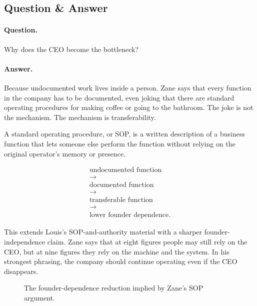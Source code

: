\documentclass[11pt,oneside]{book}
\begin{document}
\subsection{Question \& Answer}

\paragraph{Question.}
Why does the CEO become the bottleneck?

\paragraph{Answer.}
Because undocumented work lives inside a person. Zane says that every function in the company has to be documented, even joking that there are standard operating procedures for making coffee or going to the bathroom. The joke is not the mechanism. The mechanism is transferability.

A standard operating procedure, or SOP, is a written description of a business function that lets someone else perform the function without relying on the original operator's memory or presence.

\begin{equation}
\begin{gathered}
\text{undocumented function}\\
\longrightarrow\\
\text{documented function}\\
\longrightarrow\\
\text{transferable function}\\
\longrightarrow\\
\text{lower founder dependence}.
\end{gathered}
\end{equation}

This extends Louis's SOP-and-authority material with a sharper founder-independence claim. Zane says that at eight figures people may still rely on the CEO, but at nine figures they rely on the machine and the system. In his strongest phrasing, the company should continue operating even if the CEO disappears.

\begin{figure}
\centering
{}
\caption{The founder-dependence reduction implied by Zane's SOP argument.}
\end{figure}
\end{document}
